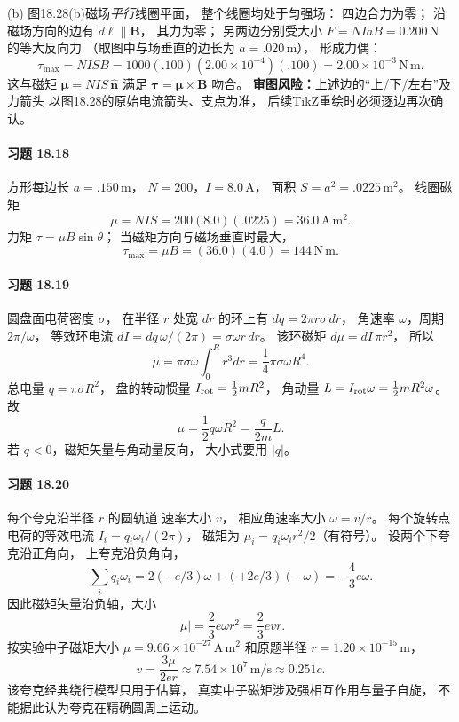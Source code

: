 (b) 图18.28(b)磁场\emph{平行}线圈平面，
整个线圈均处于匀强场：
四边合力为零；
沿磁场方向的边有
\(d\boldsymbol\ell\parallel\boldsymbol B\)，
其力为零；
另两边分别受大小
\(F=NIaB=0.200\,\mathrm N\) 的等大反向力
（取图中与场垂直的边长为 \(a=.020\,\mathrm m\)），
形成力偶：
\[
 \boxed{\tau_{\max}=NISB
 =1000(.100)(2.00\times10^{-4})(.100)
 =2.00\times10^{-3}\,\mathrm{N\,m}}.
\]
这与磁矩
\(\boldsymbol\mu=NIS\,\hat{\boldsymbol n}\)
满足
\(\boldsymbol\tau=\boldsymbol\mu\times\boldsymbol B\)
吻合。
\textbf{审图风险：}上述边的“上/下/左右”及力箭头
以图18.28的原始电流箭头、支点为准，
后续TikZ重绘时必须逐边再次确认。

\paragraph{习题 18.18}
方形每边长 \(a=.150\,\mathrm m\)，
\(N=200\)，\(I=8.0\,\mathrm A\)，
面积 \(S=a^2=.0225\,\mathrm{m^2}\)。
线圈磁矩
\[
 \boxed{\mu=NIS=200(8.0)(.0225)
 =36.0\,\mathrm{A\,m^2}}.
\]
力矩 \(\tau=\mu B\sin\theta\)；
当磁矩方向与磁场垂直时最大，
\[
 \boxed{\tau_{\max}=\mu B=(36.0)(4.0)
 =144\,\mathrm{N\,m}}.
\]

\paragraph{习题 18.19}
圆盘面电荷密度 \(\sigma\)，
在半径 \(r\) 处宽 \(dr\) 的环上有
\(dq=2\pi r\sigma\,dr\)，
角速率 \(\omega\)，周期 \(2\pi/\omega\)，
等效环电流
\(dI=dq\,\omega/(2\pi)
 =\sigma\omega r\,dr\)。
该环磁矩 \(d\mu=dI\,\pi r^2\)，
所以
\[
 \boxed{\mu=\pi\sigma\omega\int_0^Rr^3dr
 =\frac14\pi\sigma\omega R^4}.
\]
总电量
\(q=\pi\sigma R^2\)，
盘的转动惯量
\(I_{\rm rot}=\frac12mR^2\)，
角动量
\(L=I_{\rm rot}\omega
 =\frac12mR^2\omega\)。
故
\[
 \boxed{\mu=\frac12q\omega R^2
 =\frac q{2m}L}.
\]
若 \(q<0\)，磁矩矢量与角动量反向，
大小式要用 \(|q|\)。

\paragraph{习题 18.20}
每个夸克沿半径 \(r\) 的圆轨道
速率大小 \(v\)，
相应角速率大小 \(\omega=v/r\)。
每个旋转点电荷的等效电流
\(I_i=q_i\omega_i/(2\pi)\)，
磁矩为
\(\mu_i=q_i\omega_i r^2/2\)（有符号）。
设两个下夸克沿正角向，
上夸克沿负角向，
\[
 \sum_iq_i\omega_i
 =2(-e/3)\omega+(+2e/3)(-\omega)
 =-\frac43e\omega.
\]
因此磁矩矢量沿负轴，大小
\[
 \boxed{|\mu|=\frac23e\omega r^2
 =\frac23evr}.
\]
按实验中子磁矩大小
\(\mu=9.66\times10^{-27}\,\mathrm{A\,m^2}\)
和原题半径
\(r=1.20\times10^{-15}\,\mathrm m\)，
\[
 \boxed{v=\frac{3\mu}{2er}
 \approx7.54\times10^7\,\mathrm{m/s}
 \approx0.251c}.
\]
该夸克经典绕行模型只用于估算，
真实中子磁矩涉及强相互作用与量子自旋，
不能据此认为夸克在精确圆周上运动。


